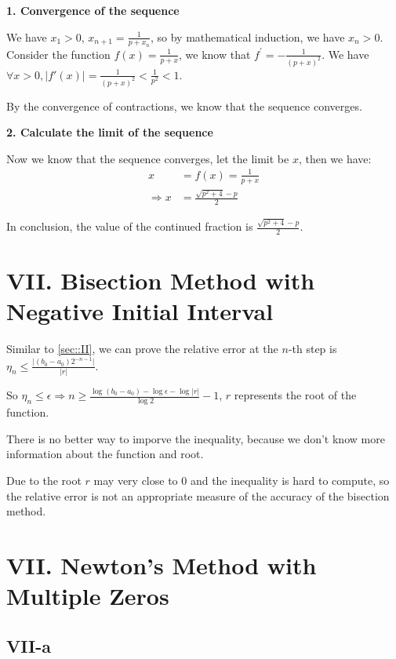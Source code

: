 \documentclass[a4paper]{article}
\begin{document}
\textbf{1. Convergence of the sequence}

We have $x_1 > 0$, $x_{n+1} = \frac{1}{p + x_n}$, so by mathematical induction, we have $x_n > 0$. Consider the function $f(x) = \frac{1}{p+x}$, we know that $f^\prime = -\frac{1}{(p+x)^2}$. We have $\forall x>0, \vert f\prime(x) \vert = \frac{1}{(p+x)^2} < \frac{1}{p^2} < 1$. 

By the convergence of contractions, we know that the sequence converges.

\textbf{2. Calculate the limit of the sequence}

Now we know that the sequence converges, let the limit be $x$, then we have:
\begin{equation}
  \begin{aligned}
    x &= f(x) = \frac{1}{p+x}\\
    \Rightarrow x &= \frac{\sqrt{p^2+4} - p}{2}
  \end{aligned}
\end{equation}

In conclusion, the value of the continued fraction is $\frac{\sqrt{p^2+4} - p}{2}$.

\section*{VII. Bisection Method with Negative Initial Interval}

Similar to \ref{sec::II}, we can prove the relative error at the $n$-th step is $\eta_n \le \frac{\vert (b_0-a_0)2^{-n-1}\vert}{\vert r \vert} $.

So $\eta_n \le \epsilon \Rightarrow n \ge \frac{\log (b_0-a_0) - \log \epsilon - \log \vert r \vert}{\log 2} - 1$, $r$ represents the root of the function.

There is no better way to imporve the inequality, because we don't know more information about the function and root. 

Due to the root $r$ may very close to $0$ and the inequality is hard to compute, so the relative error is not an appropriate measure of the accuracy of the bisection method.

\section*{VII. Newton's Method with Multiple Zeros}

\subsection*{VII-a}
\label{subsec::VII-a}
\end{document}

